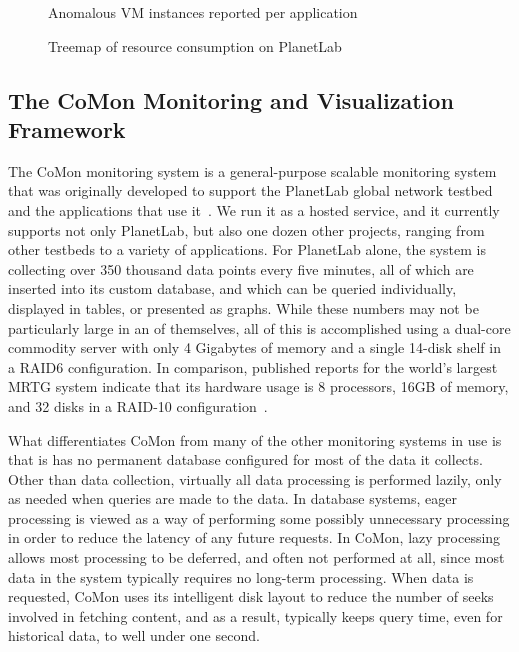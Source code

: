 \begin{figure*}[t]
\begin{minipage}{3.125in}
\caption{Anomalous VM instances reported per application}
\label{fig_comon_anomaly}
\end{minipage}
\hspace{.25in}
\begin{minipage}{3.125in}
\caption{Treemap of resource consumption on PlanetLab}
\label{fig_comon_treemap}
\end{minipage}
\end{figure*}

\subsection{The CoMon Monitoring and Visualization Framework}

The CoMon monitoring system is a general-purpose scalable monitoring
system that was originally developed to support the PlanetLab global
network testbed and the applications that use it~\cite{CoMon}. We run
it as a hosted service, and it currently supports not only PlanetLab,
but also one dozen other projects, ranging from other testbeds to a
variety of applications. For PlanetLab alone, the system is collecting
over 350 thousand data points every five minutes, all of which are
inserted into its custom database, and which can be queried
individually, displayed in tables, or presented as graphs. While these
numbers may not be particularly large in an of themselves, all of this
is accomplished using a dual-core commodity server with only 4
Gigabytes of memory and a single 14-disk shelf in a RAID6
configuration. In comparison, published reports for the world's
largest MRTG system indicate that its hardware usage is 8 processors,
16GB of memory, and 32 disks in a RAID-10 configuration~\cite{Plonka}.



What differentiates CoMon from many of the other monitoring systems in
use is that is has no permanent database configured for most of the
data it collects. Other than data collection, virtually all data
processing is performed lazily, only as needed when queries are made
to the data. In database systems, eager processing is viewed as a way
of performing some possibly unnecessary processing in order to reduce
the latency of any future requests. In CoMon, lazy processing allows
most processing to be deferred, and often not performed at all, since
most data in the system typically requires no long-term processing.
When data is requested, CoMon uses its intelligent disk layout to
reduce the number of seeks involved in fetching content, and as a
result, typically keeps query time, even for historical data, to well
under one second.

